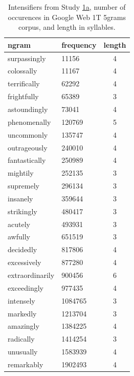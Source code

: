 

\begin{table}[hbt]
 \begin{center}
 \footnotesize
  \caption{Intensifiers from Study \hyperref[sec:study1a]{1a}, number of occurences in Google Web 1T 5grams corpus, and length in syllables.}
  \label{table:intensifiers_study1a}
  \begin{tabular}{llc}
   \hline
   ngram & frequency & length \\
    \hline
    surpassingly & 11156 & 4 \\
    colossally & 11167 & 4 \\
    terrifically & 62292 & 4 \\
    frightfully & 65389 & 3 \\
    astoundingly & 73041 & 4 \\
    phenomenally & 120769 & 5 \\
    uncommonly & 135747 & 4 \\
    outrageously & 240010 & 4 \\
    fantastically & 250989 & 4 \\
    mightily & 252135 & 3 \\
    supremely & 296134 & 3 \\
    insanely & 359644 & 3 \\
    strikingly & 480417 & 3 \\
    acutely & 493931 & 3 \\
    awfully & 651519 & 3 \\
    decidedly & 817806 & 4 \\
    excessively & 877280 & 4 \\
    extraordinarily & 900456 & 6 \\
    exceedingly & 977435 & 4 \\
    intensely & 1084765 & 3 \\
    markedly & 1213704 & 3 \\
    amazingly & 1384225 & 4 \\
    radically & 1414254 & 3 \\
    unusually & 1583939 & 4 \\
    remarkably & 1902493 & 4 \\

\end{tabular}
\end{center}
\end{table}
